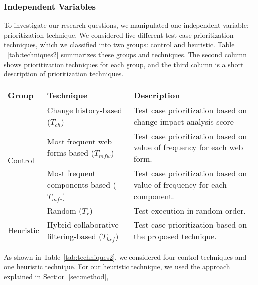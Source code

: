 \subsubsection{Independent Variables}
\label{sec:independent}

To investigate our research questions, we manipulated one independent variable: 
prioritization technique. We considered five
different test case prioritization techniques, which we classified
into two groups: control and heuristic. Table ~\ref{tab:techniques2} summarizes these
groups and techniques. The second column shows prioritization
techniques for each group, and the third column is a 
short description of prioritization techniques.


\begin{table*}[!ht]
	\caption{Test Case Prioritization Techniques}
	\vspace*{-10pt}
	\begin{center}
		\begin{tabular}{|l|l|l|}\hline
			Group & Technique & Description \\ \hline
			\multirow{4}{*}{Control} 
			& Change history-based ($T_{ch}$) & Test case prioritization based on change impact analysis score\\
			& Most frequent web forms-based ($T_{mfw}$)&  Test case prioritization based on value of frequency for each web form.\\
			& Most frequent components-based ($T_{mfc}$) &  Test case prioritization based on value of frequency for each component.\\
			& Random ($T_{r}$) &  Test execution in random order.\\\hline			
			\multirow{1}{*}{Heuristic} 
			& Hybrid collaborative filtering-based ($T_{hcf}$)& Test case prioritization based on the proposed technique. \\\hline
		\end{tabular}
		\end {center}
		\label{tab:techniques2}
		\vspace*{-5pt}
	\end{table*}

As shown in Table~\ref{tab:techniques2}, we considered four control techniques and 
one heuristic technique. For our heuristic technique, we used the approach 
explained in Section~\ref{sec:method},


%

